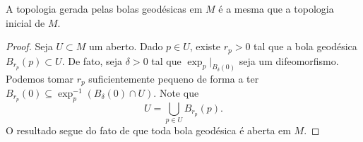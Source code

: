 
\begin{lemma}
    \label{lem:bolas-topologia-inicial}
    A topologia gerada pelas bolas geodésicas em $M$ é a mesma que a topologia inicial de $M$.
    \begin{proof}

        Seja $U \subset M$ um aberto. Dado $p \in U$, existe $r_p > 0$ tal que a bola geodésica $B_{r_p}(p) \subset U$. De fato, seja $\delta>0$ tal que $\exp_{p}|_{B_{\delta}(0)}$ seja um difeomorfismo. Podemos tomar $r_{p}$ suficientemente pequeno de forma a ter $B_{r_{p}}(0)\subseteq \exp_{p}^{-1}(B_{\delta}(0)\cap U)$.
        Note que
        \begin{equation*}
            U = \bigcup_{p \in U} B_{r_p}(p).
        \end{equation*}
        O resultado segue do fato de que toda bola geodésica é aberta em $M$.
    \end{proof}
\end{lemma}
